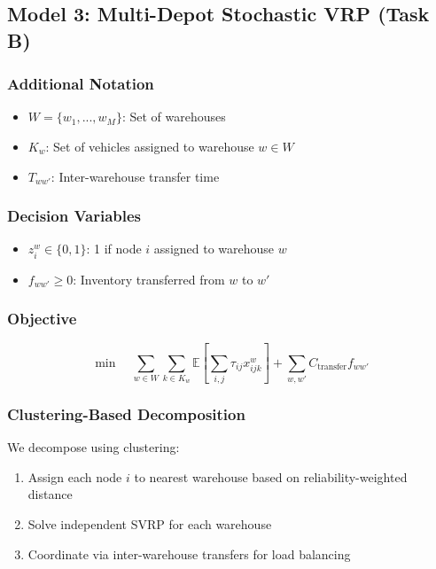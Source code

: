 \subsection{Model 3: Multi-Depot Stochastic VRP (Task B)}

\subsubsection{Additional Notation}

\begin{itemize}
\item $W = \{w_1, ..., w_M\}$: Set of warehouses
\item $K_w$: Set of vehicles assigned to warehouse $w \in W$
\item $T_{ww'}$: Inter-warehouse transfer time
\end{itemize}

\subsubsection{Decision Variables}

\begin{itemize}
\item $z_{i}^{w} \in \{0,1\}$: 1 if node $i$ assigned to warehouse $w$
\item $f_{ww'} \geq 0$: Inventory transferred from $w$ to $w'$
\end{itemize}

\subsubsection{Objective}

\begin{equation}
\min \quad \sum_{w \in W} \sum_{k \in K_w} \mathbb{E}\left[\sum_{i,j} \tau_{ij} x_{ijk}^w\right] + \sum_{w,w'} C_{\text{transfer}} f_{ww'}
\end{equation}

\subsubsection{Clustering-Based Decomposition}

We decompose using clustering:
\begin{enumerate}
\item Assign each node $i$ to nearest warehouse based on reliability-weighted distance
\item Solve independent SVRP for each warehouse
\item Coordinate via inter-warehouse transfers for load balancing
\end{enumerate}

